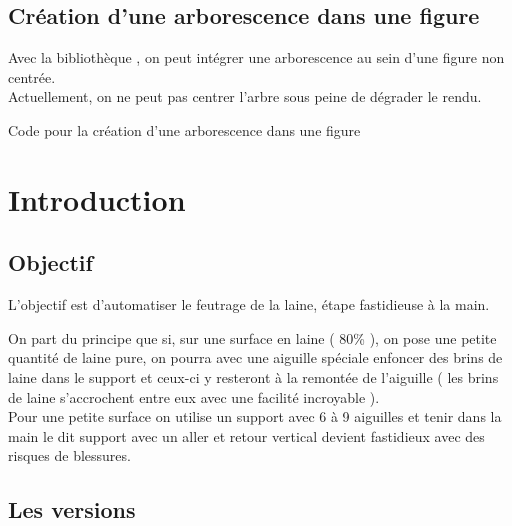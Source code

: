 {\section{Création  d'une arborescence dans une figure}

Avec la bibliothèque , on peut intégrer une arborescence au sein d'une figure non centrée.\\
Actuellement, on ne peut pas centrer l'arbre sous peine de dégrader le rendu.



\begin{Latex}{Code pour la création d'une arborescence dans une figure}
\end{Latex}

\chapter{Introduction}

\section{Objectif}

L'objectif est d'automatiser le feutrage de la laine, étape fastidieuse à la main.

On part du principe que si, sur une surface en laine ( 80\% ), on pose une petite quantité de laine pure, on pourra avec une aiguille spéciale enfoncer des brins de laine dans le support et ceux-ci y resteront à la remontée de l’aiguille ( les brins de laine s’accrochent entre eux avec une facilité incroyable ).\\
 Pour une petite surface on utilise un support avec 6 à 9 aiguilles et tenir dans la main le dit support avec un aller et retour vertical devient fastidieux avec des risques de blessures.\\


\section{Les versions}

}
